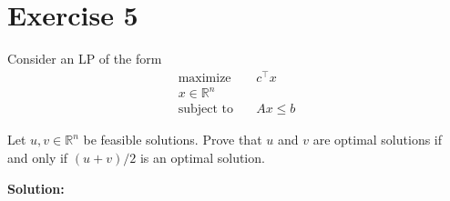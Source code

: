 \documentclass{article}
\begin{document}
\section*{Exercise 5}
Consider an LP of the form
\begin{align*}
\text{maximize} \quad & c^\top x \\
x \in \mathbb{R}^n \\
\text{subject to} \quad & Ax \leq b
\end{align*}

Let $u, v \in \mathbb{R}^n$ be feasible solutions. Prove that $u$ and $v$ are optimal solutions if and only if $(u + v)/2$ is an optimal solution.

\textbf{Solution: }
\end{document}
